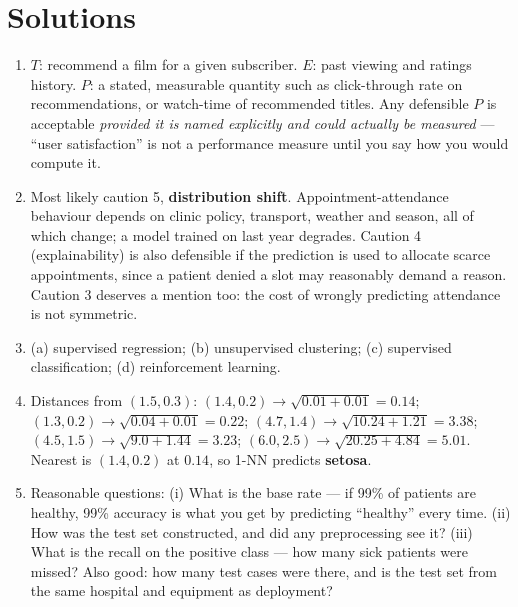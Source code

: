 \documentclass[11pt]{article}
\begin{document}
\section{Solutions}
\label{sec:solutions}

\begin{enumerate}[leftmargin=*, label=\textbf{Q\arabic*.}]

\item $T$: recommend a film for a given subscriber. $E$: past viewing and
ratings history. $P$: a stated, measurable quantity such as click-through rate
on recommendations, or watch-time of recommended titles. Any defensible $P$ is
acceptable \emph{provided it is named explicitly and could actually be
measured} --- ``user satisfaction'' is not a performance measure until you say
how you would compute it.

\item Most likely caution 5, \textbf{distribution shift}. Appointment-attendance
behaviour depends on clinic policy, transport, weather and season, all of which
change; a model trained on last year degrades. Caution 4 (explainability) is
also defensible if the prediction is used to allocate scarce appointments, since
a patient denied a slot may reasonably demand a reason. Caution 3 deserves a
mention too: the cost of wrongly predicting attendance is not symmetric.

\item (a) supervised regression; (b) unsupervised clustering; (c) supervised
classification; (d) reinforcement learning.

\item Distances from $(1.5, 0.3)$:
$(1.4,0.2) \rightarrow \sqrt{0.01+0.01} = 0.14$;
$(1.3,0.2) \rightarrow \sqrt{0.04+0.01} = 0.22$;
$(4.7,1.4) \rightarrow \sqrt{10.24+1.21} = 3.38$;
$(4.5,1.5) \rightarrow \sqrt{9.0+1.44} = 3.23$;
$(6.0,2.5) \rightarrow \sqrt{20.25+4.84} = 5.01$.
Nearest is $(1.4,0.2)$ at $0.14$, so 1-NN predicts \textbf{setosa}.

\item Reasonable questions: (i) What is the base rate --- if 99\% of patients are
healthy, 99\% accuracy is what you get by predicting ``healthy'' every time.
(ii) How was the test set constructed, and did any preprocessing see it?
(iii) What is the recall on the positive class --- how many sick patients were
missed? Also good: how many test cases were there, and is the test set from the
same hospital and equipment as deployment?


\end{enumerate}
\end{document}
